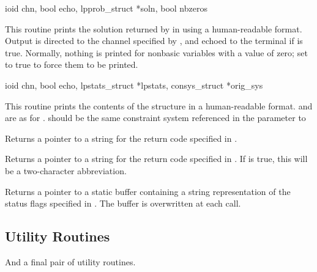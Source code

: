 \begin{subrdoc}
  \item
	  {ioid chn, bool echo, lpprob_struct *soln,  bool nbzeros}

  This routine prints the solution returned by  in 
  using a human-readable format.
  Output is directed to the channel specified by , and echoed to the
  terminal if  is true.
  Normally, nothing is printed for nonbasic variables with a value of zero;
  set  to true to force them to be printed.

  \item
	  {ioid chn, bool echo, lpstats_struct *lpstats,
	   consys_struct *orig_sys}

  This routine prints the contents of the  structure in a
  human-readable format.
   and  are as for .
   should be the same constraint system referenced in the
   parameter to 

  \item

  Returns a pointer to a string for the return code
  specified in .

  \item

  Returns a pointer to a string for the return code
  specified in .
  If  is true, this will be a two-character abbreviation.

  \item

  Returns a pointer to a static buffer containing a string representation
  of the status flags specified in .
  The buffer is overwritten at each call.
\end{subrdoc}

\subsection{Utility Routines}
\label{sec:UtilityRoutines}

And a final pair of utility routines.

